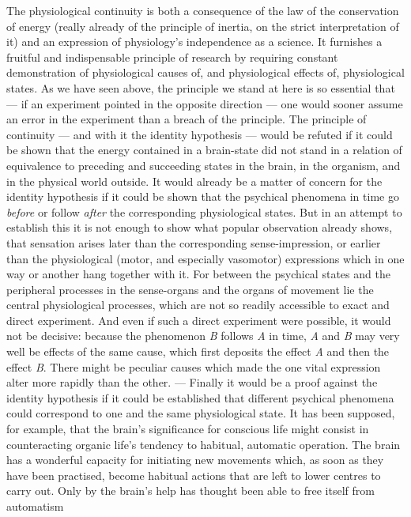 \documentclass[12pt,a4paper]{book}
\newcommand{\opage}[1]{\marginnote{\footnotesize\textit{[#1]}}}
\begin{document}
\opage{23}The physiological continuity is both a consequence of the law of the
conservation of energy (really already of the principle of inertia, on the
strict interpretation of it) and an expression of physiology's independence as a
science. It furnishes a fruitful and indispensable principle of research by
requiring constant demonstration of physiological causes of, and physiological
effects of, physiological states. As we have seen above, the principle we stand
at here is so essential that --- if an experiment pointed in the opposite
direction --- one would sooner assume an error in the experiment than a breach
of the principle. The principle of continuity --- and with it the identity
hypothesis --- would be refuted if it could be shown that the energy contained
in a brain-state did not stand in a relation of equivalence to preceding and
succeeding states in the brain, in the organism, and in the physical world
outside. It would already be a matter of concern for the identity hypothesis if
it could be shown that the psychical phenomena in time go \emph{before} or
follow \emph{after} the corresponding physiological states. But in an attempt to
establish this it is not enough to show what popular observation already shows,
that sensation arises later than the corresponding sense-impression, or earlier
than the physiological (motor, and especially vasomotor) expressions which in
one way or another hang together with it. For between the psychical states and
the peripheral processes in the sense-organs and the organs of movement lie the
central physiological processes, which are not so readily accessible to exact
and direct experiment. And even if such a direct experiment were possible, it
would not be decisive: because the phenomenon \textit{B} follows \textit{A} in
time, \textit{A} and \textit{B} may very well be effects of the same cause,
which first deposits the effect \textit{A} and then the effect \textit{B}. There
might be peculiar causes which made the one vital expression alter more rapidly
than the other. --- Finally it would be a proof against the identity hypothesis
if it could be established that different psychical phenomena could correspond
to one and the same physiological state. It has been supposed, for example, that
the brain's significance for conscious life might consist in counteracting
organic life's tendency to habitual, automatic \opage{24}operation. The brain has a
wonderful capacity for initiating new movements which, as soon as they have been
practised, become habitual actions that are left to lower centres to carry out.
Only by the brain's help has thought been able to free itself from automatism
\end{document}
